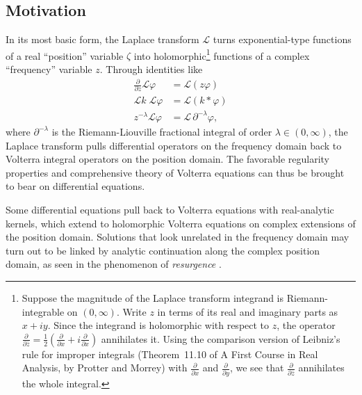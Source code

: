 \documentclass{article}
\theoremstyle{plain}
\newcommand{\laplace}{\mathcal{L}}
\newenvironment{verify}{\color{ForestGreen}}{\color{black}}
\begin{document}
\subsection{Motivation}\label{motivation}
In its most basic form, the Laplace transform $\laplace$ turns exponential-type functions of a real ``position'' variable $\zeta$ into holomorphic\begin{verify}\footnote{\begin{verify}Suppose the magnitude of the Laplace transform integrand is Riemann-integrable on $(0, \infty)$. Write $z$ in terms of its real and imaginary parts as $x + iy$. Since the integrand is holomorphic with respect to $z$, the operator $\frac{\partial}{\partial\overline{z}} = \frac{1}{2}\left(\frac{\partial}{\partial x} + i\frac{\partial}{\partial x}\right)$ annihilates it. Using the comparison version of Leibniz's rule for improper integrals (Theorem~11.10 of A First Course in Real Analysis, by Protter and Morrey) with $\frac{\partial}{\partial x}$ and $\frac{\partial}{\partial y}$, we see that $\frac{\partial}{\partial\overline{z}}$ annihilates the whole integral.\end{verify}}\end{verify} functions of a complex ``frequency'' variable $z$. Through identities like
\begin{align*}
\frac{\partial}{\partial z} \laplace \varphi & = \laplace(z\varphi) \\
\laplace k\;\laplace \varphi & = \laplace(k * \varphi) \\
z^{-\lambda} \laplace \varphi & = \laplace\,\partial^{-\lambda} \varphi,
\end{align*}
where $\partial^{-\lambda}$ is the Riemann-Liouville fractional integral of order $\lambda \in (0, \infty)$, the Laplace transform pulls differential operators on the frequency domain back to Volterra integral operators on the position domain. The favorable regularity properties and comprehensive theory of Volterra equations can thus be brought to bear on differential equations.

Some differential equations pull back to Volterra equations with real-analytic kernels, which extend to holomorphic Volterra equations on complex extensions of the position domain. Solutions that look unrelated in the frequency domain may turn out to be linked by analytic continuation along the complex position domain, as seen in the phenomenon of {\em resurgence} \cite{EcalleIII}\cite{lectures-marino} \cite[Section 2.4]{sternin1995borel}.
\end{document}
